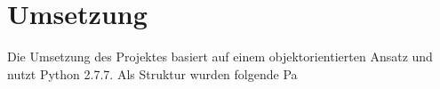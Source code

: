\section{Umsetzung}
\label{sec:implementation}

Die Umsetzung des Projektes basiert auf einem objektorientierten Ansatz und nutzt Python 2.7.7.
Als Struktur wurden folgende Pa

